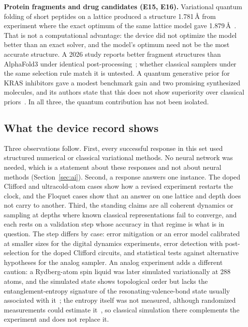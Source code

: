 \documentclass[10pt,a4paper]{article}
\begin{document}
\textbf{Protein fragments and drug candidates (E15, E16).} Variational quantum folding of short peptides on a lattice produced a structure 1.781\,\AA{} from experiment where the exact optimum of the same lattice model gave 1.879\,\AA~\cite{robert2021,doga2024}. That is not a computational advantage: the device did not optimize the model better than an exact solver, and the model's optimum need not be the most accurate structure. A 2026 study reports better fragment structures than AlphaFold3 under identical post-processing~\cite{zhang2026}; whether classical samplers under the same selection rule match it is untested. A quantum generative prior for KRAS inhibitors gave a modest benchmark gain and two promising synthesized molecules, and its authors state that this does not show superiority over classical priors~\cite{kras2025,uoft2025}. In all three, the quantum contribution has not been isolated.

\subsection{What the device record shows}
Three observations follow. First, every successful response in this set used structured numerical or classical variational methods. No neural network was needed, which is a statement about these responses and not about neural methods (Section~\ref{sec:ai}). Second, a response answers one instance. The doped Clifford and ultracold-atom cases show how a revised experiment restarts the clock, and the Floquet cases show that an answer on one lattice and depth does not carry to another. Third, the standing claims are all coherent dynamics or sampling at depths where known classical representations fail to converge, and each rests on a validation step whose accuracy in that regime is what is in question. The step differs by case: error mitigation or an error model calibrated at smaller sizes for the digital dynamics experiments, error detection with post-selection for the doped Clifford circuits, and statistical tests against alternative hypotheses for the analog sampler. An analog experiment adds a different caution: a Rydberg-atom spin liquid was later simulated variationally at 288 atoms, and the simulated state shows topological order but lacks the entanglement-entropy signature of the resonating-valence-bond state usually associated with it~\cite{semeghini2021,mauron2025tee}; the entropy itself was not measured, although randomized measurements could estimate it~\cite{brydges2019}, so classical simulation there complements the experiment and does not replace it.
\end{document}
